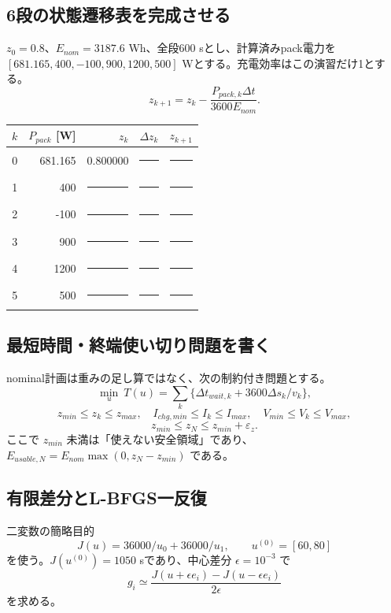 \subsection{6段の状態遷移表を完成させる}
$z_0=0.8$、$E_{nom}=3187.6$ Wh、全段600 sとし、計算済みpack電力を
$[681.165,400,-100,900,1200,500]$ Wとする。充電効率はこの演習だけ1とする。
\[
z_{k+1}=z_k-\frac{P_{pack,k}\Delta t}{3600E_{nom}}.
\]
\begin{center}
\small
\begin{tabular}{c r r r r}
\toprule
$k$&$P_{pack}$ [W]&$z_k$&$\Delta z_k$&$z_{k+1}$\\
\midrule
0&681.165&0.800000&\rule{17mm}{0.4pt}&\rule{17mm}{0.4pt}\\
1&400&\rule{17mm}{0.4pt}&\rule{17mm}{0.4pt}&\rule{17mm}{0.4pt}\\
2&-100&\rule{17mm}{0.4pt}&\rule{17mm}{0.4pt}&\rule{17mm}{0.4pt}\\
3&900&\rule{17mm}{0.4pt}&\rule{17mm}{0.4pt}&\rule{17mm}{0.4pt}\\
4&1200&\rule{17mm}{0.4pt}&\rule{17mm}{0.4pt}&\rule{17mm}{0.4pt}\\
5&500&\rule{17mm}{0.4pt}&\rule{17mm}{0.4pt}&\rule{17mm}{0.4pt}\\
\bottomrule
\end{tabular}
\end{center}


\subsection{最短時間・終端使い切り問題を書く}
nominal計画は重みの足し算ではなく、次の制約付き問題とする。
\[
\min_u\ T(u)=\sum_k\{\Delta t_{wait,k}+3600\Delta s_k/v_k\},
\]
\[
z_{min}\le z_k\le z_{max},\quad I_{chg,min}\le I_k\le I_{max},
\quad V_{min}\le V_k\le V_{max},
\]
\[
z_{min}\le z_N\le z_{min}+\varepsilon_z.
\]
ここで $z_{min}$ 未満は「使えない安全領域」であり、
$E_{usable,N}=E_{nom}\max(0,z_N-z_{min})$ である。


\subsection{有限差分とL-BFGS一反復}
二変数の簡略目的
\[
J(u)=36000/u_0+36000/u_1,\qquad u^{(0)}=[60,80]
\]
を使う。$J(u^{(0)})=1050$ sであり、中心差分 $\epsilon=10^{-3}$ で
\[
g_i\simeq\frac{J(u+\epsilon e_i)-J(u-\epsilon e_i)}{2\epsilon}
\]
を求める。

